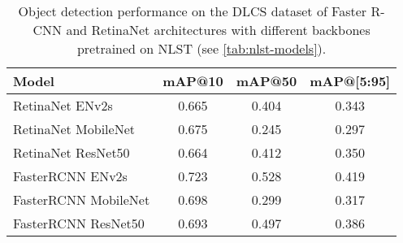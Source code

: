 \begin{table}[h]
    \centering
    \begin{tabular}{lccc}
        \hline
        \textbf{Model} & \textbf{mAP@10} & \textbf{mAP@50} & \textbf{mAP@[5:95]} \\
        \hline
        RetinaNet ENv2s      & 0.665 & 0.404 & 0.343 \\
        RetinaNet MobileNet  & 0.675 & 0.245 & 0.297 \\
        RetinaNet ResNet50   & 0.664 & 0.412 & 0.350 \\
        \rowcolor{yellow!20}
        FasterRCNN ENv2s     & 0.723 & 0.528 & 0.419 \\
        FasterRCNN MobileNet & 0.698 & 0.299 & 0.317 \\
        FasterRCNN ResNet50  & 0.693 & 0.497 & 0.386 \\
        \hline
    \end{tabular}
    \caption{Object detection performance on the DLCS dataset of Faster R-CNN and RetinaNet architectures with different backbones pretrained on NLST (see \ref{tab:nlst-models}).}
    \label{tab:dlcs-models-pretrained}
\end{table}